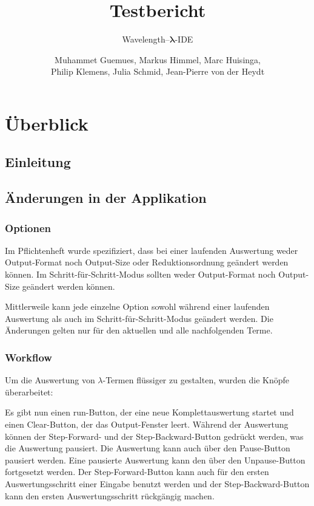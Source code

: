 \documentclass[parskip=full,11pt,openany]{scrreprt}
\title{Testbericht}
\subtitle{Wavelength--$\bm{\lambda}$-IDE}
\author{Muhammet Guemues, Markus Himmel, Marc Huisinga,\\Philip Klemens, Julia Schmid, Jean-Pierre von der Heydt}
\begin{document}
\maketitle
\newpage
\tableofcontents
\newpage

\chapter{Überblick}

\section{Einleitung}


\section{Änderungen in der Applikation}
\subsection{Optionen}
Im Pflichtenheft wurde spezifiziert, dass bei einer laufenden Auswertung weder Output-Format noch Output-Size
oder Reduktionsordnung geändert werden können. Im Schritt-für-Schritt-Modus sollten weder Output-Format noch
Output-Size geändert werden können. 

Mittlerweile kann jede einzelne Option sowohl während einer laufenden Auswertung als auch im Schritt-für-Schritt-Modus
geändert werden. Die Änderungen gelten nur für den aktuellen und alle nachfolgenden Terme.

\subsection{Workflow}\label{changeWorkflow}
Um die Auswertung von $\lambda$-Termen flüssiger zu gestalten, wurden die Knöpfe überarbeitet:

Es gibt nun einen run-Button, der eine neue Komplettauswertung startet und einen Clear-Button, der das Output-Fenster leert.
Während der Auswertung können der Step-Forward- und der Step-Backward-Button gedrückt werden, was die Auswertung pausiert. 
Die Auswertung kann auch über den Pause-Button pausiert werden.
Eine pausierte Auswertung kann den über den Unpause-Button fortgesetzt werden.
Der Step-Forward-Button kann auch für den ersten Auswertungsschritt einer Eingabe benutzt werden und der Step-Back\-ward-Button
kann den ersten Auswertungsschritt rückgängig machen.
\end{document}
